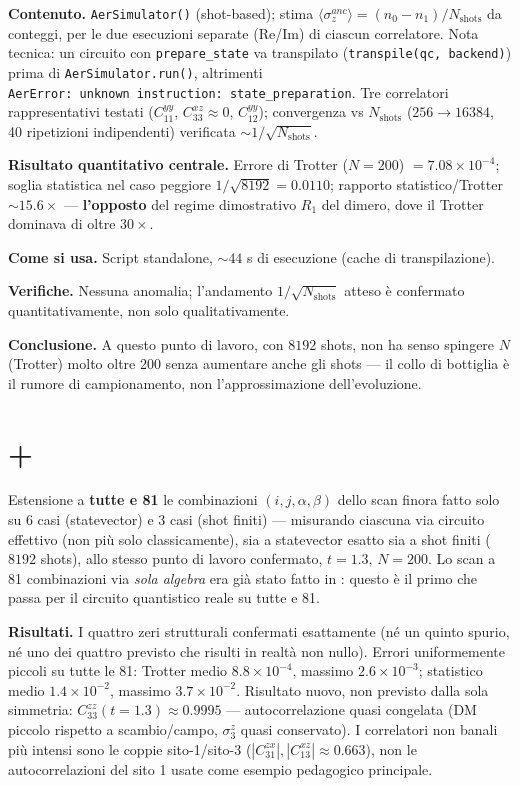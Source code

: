 \documentclass[11pt,a4paper]{article}
\begin{document}
\textbf{Contenuto.} \texttt{AerSimulator()} (shot-based); stima
$\langle\sigma_z^{anc}\rangle=(n_0-n_1)/N_\text{shots}$ da conteggi, per le due
esecuzioni separate (Re/Im) di ciascun correlatore. Nota tecnica: un circuito con
\texttt{prepare\_state} va transpilato (\texttt{transpile(qc,\ backend)}) prima di
\texttt{AerSimulator.run()}, altrimenti \texttt{AerError:\ unknown\ instruction:\
state\_preparation}. Tre correlatori rappresentativi testati
($C_{11}^{yy}$, $C_{33}^{xz}\approx0$, $C_{12}^{yy}$); convergenza vs
$N_\text{shots}$ ($256\to16384$, 40 ripetizioni indipendenti) verificata
$\sim1/\sqrt{N_\text{shots}}$.

\textbf{Risultato quantitativo centrale.} Errore di Trotter ($N=200$) $=7.08\times
10^{-4}$; soglia statistica nel caso peggiore $1/\sqrt{8192}=0.0110$; rapporto
statistico/Trotter $\sim15.6\times$ — \textbf{l'opposto} del regime dimostrativo
$R_1$ del dimero, dove il Trotter dominava di oltre $30\times$.

\textbf{Come si usa.} Script standalone, $\sim44$ s di esecuzione (cache di
transpilazione).

\textbf{Verifiche.} Nessuna anomalia; l'andamento $1/\sqrt{N_\text{shots}}$ atteso
è confermato quantitativamente, non solo qualitativamente.

\textbf{Conclusione.} A questo punto di lavoro, con $8192$ shots, non ha senso
spingere $N$ (Trotter) molto oltre 200 senza aumentare anche gli shots — il collo
di bottiglia è il rumore di campionamento, non l'approssimazione dell'evoluzione.

\section*{\texttt{} + \texttt{}}

Estensione a \textbf{tutte e 81} le combinazioni $(i,j,\alpha,\beta)$ dello scan
finora fatto solo su 6 casi (statevector) e 3 casi (shot finiti) — misurando
ciascuna via circuito effettivo (non più solo classicamente), sia a statevector
esatto sia a shot finiti ($8192$ shots), allo stesso punto di lavoro confermato,
$t=1.3$, $N=200$. Lo scan a 81 combinazioni via \emph{sola algebra} era già stato
fatto in \texttt{\seqsplit{simmetrie\_correlatori\_trimero\_anello.tex}}: questo è
il primo che passa per il circuito quantistico reale su tutte e 81.

\textbf{Risultati.} I quattro zeri strutturali confermati esattamente (né un
quinto spurio, né uno dei quattro previsto che risulti in realtà non nullo).
Errori uniformemente piccoli su tutte le 81: Trotter medio $8.8\times10^{-4}$,
massimo $2.6\times10^{-3}$; statistico medio $1.4\times10^{-2}$, massimo
$3.7\times10^{-2}$. Risultato nuovo, non previsto dalla sola simmetria:
$C_{33}^{zz}(t{=}1.3)\approx0.9995$ — autocorrelazione quasi congelata (DM piccolo
rispetto a scambio/campo, $\sigma_3^z$ quasi conservato). I correlatori non banali
più intensi sono le coppie sito-1/sito-3 ($|C_{31}^{zx}|,|C_{13}^{xz}|\approx0.663$),
non le autocorrelazioni del sito 1 usate come esempio pedagogico principale.
\end{document}
